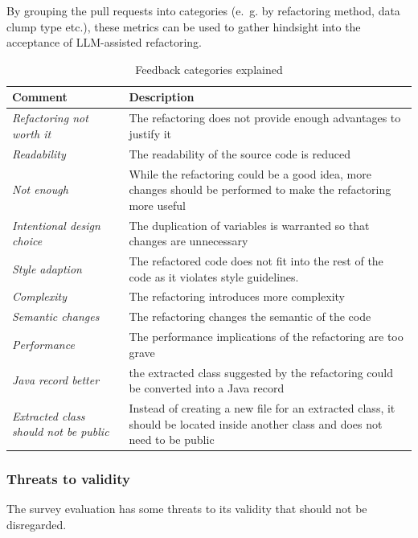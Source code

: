 By grouping the pull requests into categories (e.~g. by refactoring method, data clump type etc.), these metrics can be used to gather hindsight into the acceptance of \ac{LLM}-assisted refactoring. 


\begin{table}
\begin{tabular}{p{2cm}|p{10cm}}
	Comment & Description\\\hline
	\textit{Refactoring not worth it} & The refactoring does not provide enough advantages to justify it\\\hline
	\textit{Readability} & The readability of the source code is reduced \\\hline
	\textit{Not enough} & While the refactoring could be a good idea, more changes should be performed to make the refactoring more useful \\\hline
	\textit{Intentional design choice} & The duplication of variables is warranted so that changes are unnecessary \\\hline
	\textit{Style adaption} & The refactored code does not fit into the rest of the code as it violates style guidelines. \\\hline
	\textit{Complexity} & The refactoring introduces more complexity\\\hline
	\textit{Semantic changes} &  The refactoring changes the semantic of the code\\\hline
	\textit{Performance}& The performance implications of the refactoring are too grave \\\hline
	\textit{Java record better} & the extracted class suggested by the refactoring could be converted into a Java record \\\hline
	\textit{Extracted class should not be public} & Instead of creating a new file for an extracted class, it should be located inside another class and does not need to be public \\\hline
	
\end{tabular}
\caption{Feedback categories explained}
\label{tbl:feedback_categories}
\end{table} 


\subsubsection{Threats to validity}

The survey evaluation has some threats to its validity that should not be disregarded.

